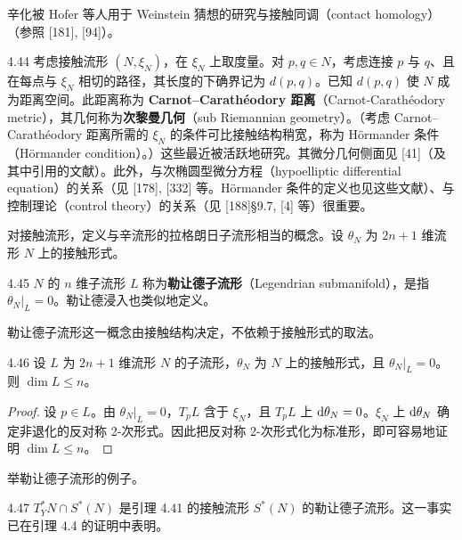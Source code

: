 辛化被 Hofer 等人用于 Weinstein 猜想的研究与接触同调（contact homology）（参照 [181], [94]）。

\begin{remark}{4.44}
  考虑接触流形 $(N,\xi_N)$，在 $\xi_N$ 上取度量。对 $p,q\in N$，考虑连接 $p$ 与 $q$、且在每点与 $\xi_N$ 相切的路径，其长度的下确界记为 $d(p,q)$。已知 $d(p,q)$ 使 $N$ 成为距离空间。此距离称为 \textbf{Carnot–Carathéodory 距离}（Carnot-Carathéodory metric），其几何称为\textbf{次黎曼几何}（sub Riemannian geometry）。（考虑 Carnot–Carathéodory 距离所需的 $\xi_N$ 的条件可比接触结构稍宽，称为 Hörmander 条件（Hörmander condition）。）这些最近被活跃地研究。其微分几何侧面见 [41]（及其中引用的文献）。此外，与次椭圆型微分方程（hypoelliptic differential equation）的关系（见 [178], [332] 等。Hörmander 条件的定义也见这些文献）、与控制理论（control theory）的关系（见 [188]§9.7, [4] 等）很重要。
\end{remark}

对接触流形，定义与辛流形的拉格朗日子流形相当的概念。设 $\theta_N$ 为 $2n+1$ 维流形 $N$ 上的接触形式。

\begin{definition}{4.45}
  $N$ 的 $n$ 维子流形 $L$ 称为\textbf{勒让德子流形}（Legendrian submanifold），是指 $\theta_N|_L=0$。勒让德浸入也类似地定义。
\end{definition}

勒让德子流形这一概念由接触结构决定，不依赖于接触形式的取法。

\begin{lemma*}{4.46}
  设 $L$ 为 $2n+1$ 维流形 $N$ 的子流形，$\theta_N$ 为 $N$ 上的接触形式，且 $\theta_N|_L=0$。则 $\dim L\le n$。
\end{lemma*}
\begin{proof}
  设 $p\in L$。由 $\theta_N|_L=0$，$T_pL$ 含于 $\xi_N$，且 $T_pL$ 上 $\mathrm{d}\theta_N=0$。$\xi_N$ 上 $\mathrm{d}\theta_N$ 确定非退化的反对称 2-次形式。因此把反对称 2-次形式化为标准形，即可容易地证明 $\dim L\le n$。
\end{proof}

举勒让德子流形的例子。

\begin{example}{4.47}
  $T_Y^*N\cap S^*(N)$ 是引理 4.41 的接触流形 $S^*(N)$ 的勒让德子流形。这一事实已在引理 4.4 的证明中表明。
\end{example}

